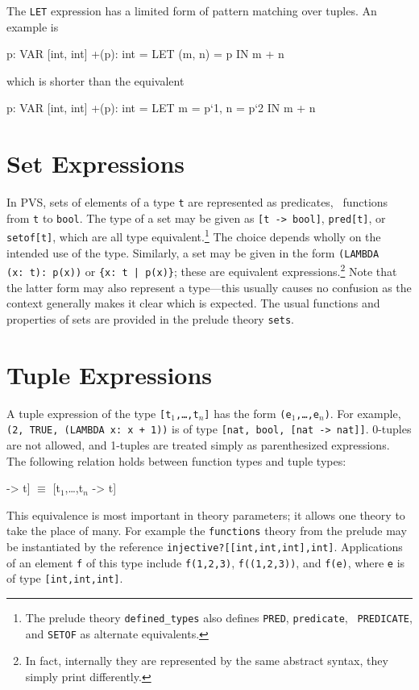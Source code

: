 The \texttt{LET} expression has a limited form of pattern matching over
tuples.  An example is
\begin{pvsex}
  p: VAR [int, int]
  +(p): int = LET (m, n) = p IN m + n
\end{pvsex}
which is shorter than the equivalent
\begin{pvsex}
  p: VAR [int, int]
  +(p): int = LET m = p`1, n = p`2 IN m + n
\end{pvsex}


\section{Set Expressions}\label{set-exprs}

In PVS, sets of elements of a type \texttt{t} are represented as
predicates, \ie\ functions from \texttt{t} to \texttt{bool}.  The type of a
set may be given as \texttt{[t -> bool]}, \texttt{pred[t]}, or \texttt{
setof[t]}, which are all type equivalent.\footnote{The prelude theory
\texttt{defined\_types} also defines \texttt{PRED}, \texttt{predicate}, \texttt{
PREDICATE}, and \texttt{SETOF} as alternate equivalents.}
The choice depends wholly on the intended use of the type.
Similarly, a set may be given in the form \texttt{(LAMBDA (x:\ t):\
p(x))} or \texttt{\{x:\ t | p(x)\}}; these are equivalent
expressions.\footnote{In fact, internally they are represented by the
same abstract syntax, they simply print differently.} Note that the
latter form may also represent a type---this usually causes no
confusion as the context generally makes it clear which is expected.
The usual functions and properties of sets are provided in the prelude
theory \texttt{sets}.


\section{Tuple Expressions}\label{tuple-exprs}

A tuple expression of the type \texttt{[t$_1$,\ldots,t$_n$]} has the form
\texttt{(e$_1$,\ldots,e$_n$)}.  For example, \texttt{(2, TRUE, (LAMBDA x:\ x +
1))} is of type \texttt{[nat, bool, [nat -> nat]]}.  0-tuples are not
allowed, and 1-tuples are treated simply as parenthesized expressions.
The following relation holds between function types and tuple types:
\begin{pvsex}
  [[t\(_1\),\ldots,t\(_n\)] -> t] \(\equiv\) [t\(_1\),\ldots,t\(_n\) -> t]
\end{pvsex}
%
This equivalence is most important in theory parameters; it allows one
theory to take the place of many.  For example the \texttt{functions}
theory from the prelude may be instantiated by the reference
\texttt{injective?[[int,int,int],int]}.  Applications of an element \texttt{f} of
this type include \texttt{f(1,2,3)}, \texttt{f((1,2,3))}, and \texttt{f(e)},
where \texttt{e} is of type \texttt{[int,int,int]}.

